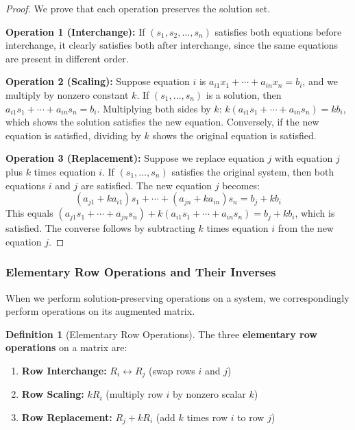 \documentclass[12pt]{article}
\numberwithin{equation}{section}
\theoremstyle{plain}
\theoremstyle{definition}
\newtheorem{definition}[theorem]{Definition}
\theoremstyle{remark}
\begin{document}
\begin{proof}
We prove that each operation preserves the solution set.

\textbf{Operation 1 (Interchange):} If $(s_1, s_2, \ldots, s_n)$ satisfies both equations before interchange, it clearly satisfies both after interchange, since the same equations are present in different order.

\textbf{Operation 2 (Scaling):} Suppose equation $i$ is $a_{i1}x_1 + \cdots + a_{in}x_n = b_i$, and we multiply by nonzero constant $k$. If $(s_1, \ldots, s_n)$ is a solution, then $a_{i1}s_1 + \cdots + a_{in}s_n = b_i$. Multiplying both sides by $k$: $k(a_{i1}s_1 + \cdots + a_{in}s_n) = kb_i$, which shows the solution satisfies the new equation. Conversely, if the new equation is satisfied, dividing by $k$ shows the original equation is satisfied.

\textbf{Operation 3 (Replacement):} Suppose we replace equation $j$ with equation $j$ plus $k$ times equation $i$. If $(s_1, \ldots, s_n)$ satisfies the original system, then both equations $i$ and $j$ are satisfied. The new equation $j$ becomes:
$$(a_{j1} + ka_{i1})s_1 + \cdots + (a_{jn} + ka_{in})s_n = b_j + kb_i$$
This equals $(a_{j1}s_1 + \cdots + a_{jn}s_n) + k(a_{i1}s_1 + \cdots + a_{in}s_n) = b_j + kb_i$, which is satisfied. The converse follows by subtracting $k$ times equation $i$ from the new equation $j$.
\end{proof}

\subsubsection{Elementary Row Operations and Their Inverses}

When we perform solution-preserving operations on a system, we correspondingly perform operations on its augmented matrix.

\begin{definition}[Elementary Row Operations]
The three \textbf{elementary row operations} on a matrix are:
\begin{enumerate}
\item \textbf{Row Interchange:} $R_i \leftrightarrow R_j$ (swap rows $i$ and $j$)
\item \textbf{Row Scaling:} $kR_i$ (multiply row $i$ by nonzero scalar $k$)  
\item \textbf{Row Replacement:} $R_j + kR_i$ (add $k$ times row $i$ to row $j$)
\end{enumerate}
\end{definition}
\end{document}
